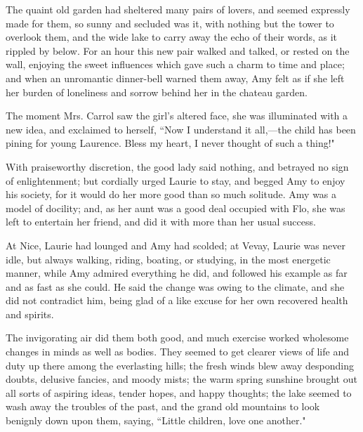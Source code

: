 The quaint old garden had sheltered many pairs of lovers, and seemed
expressly made for them, so sunny and secluded was it, with nothing but
the tower to overlook them, and the wide lake to carry away the echo of
their words, as it rippled by below. For an hour this new pair walked
and talked, or rested on the wall, enjoying the sweet influences which
gave such a charm to time and place; and when an unromantic dinner-bell
warned them away, Amy felt as if she left her burden of loneliness and
sorrow behind her in the chateau garden.

The moment Mrs. Carrol saw the girl's altered face, she
was illuminated with a new idea, and exclaimed to herself, ``Now I
understand it all,---the child has been pining for young Laurence. Bless
my heart, I never thought of such a thing!"

With praiseworthy discretion, the good lady said nothing, and betrayed
no sign of enlightenment; but cordially urged Laurie to stay, and begged
Amy to enjoy his society, for it would do her more good than so much
solitude. Amy was a model of docility; and, as her aunt was a good deal
occupied with Flo, she was left to entertain her friend, and did it with
more than her usual success.

At Nice, Laurie had lounged and Amy had scolded; at Vevay, Laurie was
never idle, but always walking, riding, boating, or studying, in the
most energetic manner, while Amy admired everything he did, and followed
his example as far and as fast as she could. He said the change was
owing to the climate, and she did not contradict him, being glad of a
like excuse for her own recovered health and spirits.

The invigorating air did them both good, and much exercise worked
wholesome changes in minds as well as bodies. They seemed to get clearer
views of life and duty up there among the everlasting hills; the fresh
winds blew away desponding doubts, delusive fancies, and moody mists;
the warm spring sunshine brought out all sorts of aspiring ideas, tender
hopes, and happy thoughts; the lake seemed to wash away the troubles of
the past, and the grand old mountains to look benignly down upon them,
saying, ``Little children, love one another."

